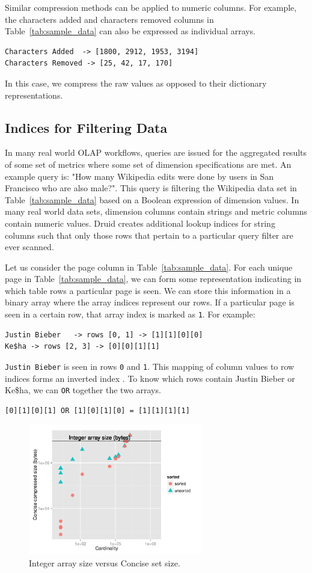 \documentclass{acm_proc_article-sp}
\begin{document}
Similar compression methods can be applied to numeric
columns. For example, the characters added and characters removed columns in
Table~\ref{tab:sample_data} can also be expressed as individual
arrays.
\begin{verbatim}
Characters Added  -> [1800, 2912, 1953, 3194]
Characters Removed -> [25, 42, 17, 170]
\end{verbatim}
In this case, we compress the raw values as opposed to their dictionary
representations.

\subsection{Indices for Filtering Data}
In many real world OLAP workflows, queries are issued for the aggregated
results of some set of metrics where some set of dimension specifications are
met. An example query is: "How many Wikipedia edits were done by users in
San Francisco who are also male?". This query is filtering the Wikipedia data
set in Table~\ref{tab:sample_data} based on a Boolean expression of dimension
values. In many real world data sets, dimension columns contain strings and
metric columns contain numeric values. Druid creates additional lookup
indices for string columns such that only those rows that pertain to a
particular query filter are ever scanned.

Let us consider the page column in
Table~\ref{tab:sample_data}. For each unique page in
Table~\ref{tab:sample_data}, we can form some representation
indicating in which table rows a particular page is seen. We can
store this information in a binary array where the array indices
represent our rows. If a particular page is seen in a certain
row, that array index is marked as \texttt{1}. For example:
\begin{verbatim}
Justin Bieber   -> rows [0, 1] -> [1][1][0][0]
Ke$ha -> rows [2, 3] -> [0][0][1][1]
\end{verbatim}

\texttt{Justin Bieber} is seen in rows \texttt{0} and \texttt{1}. This mapping of column values
to row indices forms an inverted index \cite{tomasic1993performance}. To know which
rows contain {\ttfamily Justin Bieber} or {\ttfamily Ke\$ha}, we can \texttt{OR} together
the two arrays.
\begin{verbatim}
[0][1][0][1] OR [1][0][1][0] = [1][1][1][1]
\end{verbatim}

\begin{figure}
\centering
\includegraphics[width = 3in]{concise_plot}
\caption{Integer array size versus Concise set size.}
\label{fig:concise_plot}
\end{figure}
\end{document}
